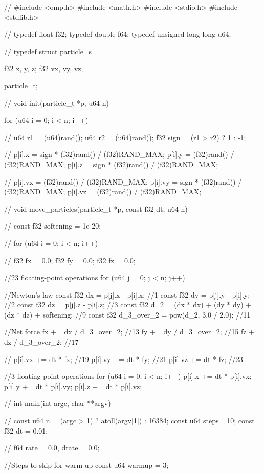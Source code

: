 \documentclass[a4paper, 12pt, twoside]{article}
\begin{document}
\begin{customFrame}
//
#include <omp.h>
#include <math.h>
#include <stdio.h>
#include <stdlib.h>

//
typedef float              f32;
typedef double             f64;
typedef unsigned long long u64;

//
typedef struct particle_s {

  f32 x, y, z;
  f32 vx, vy, vz;
  
} particle_t;

//
void init(particle_t *p, u64 n)
{
  for (u64 i = 0; i < n; i++)
    {
      //
      u64 r1 = (u64)rand();
      u64 r2 = (u64)rand();
      f32 sign = (r1 > r2) ? 1 : -1;
      
      //
      p[i].x = sign * (f32)rand() / (f32)RAND_MAX;
      p[i].y = (f32)rand() / (f32)RAND_MAX;
      p[i].z = sign * (f32)rand() / (f32)RAND_MAX;

      //
      p[i].vx = (f32)rand() / (f32)RAND_MAX;
      p[i].vy = sign * (f32)rand() / (f32)RAND_MAX;
      p[i].vz = (f32)rand() / (f32)RAND_MAX;
    }
}

//
void move_particles(particle_t *p, const f32 dt, u64 n)
{
  //
  const f32 softening = 1e-20;

  //
  for (u64 i = 0; i < n; i++)
    {
      //
      f32 fx = 0.0;
      f32 fy = 0.0;
      f32 fz = 0.0;

      //23 floating-point operations
      for (u64 j = 0; j < n; j++)
	{
	  //Newton's law
	  const f32 dx = p[j].x - p[i].x; //1
	  const f32 dy = p[j].y - p[i].y; //2
	  const f32 dz = p[j].z - p[i].z; //3
	  const f32 d_2 = (dx * dx) + (dy * dy) + (dz * dz) + softening; //9
	  const f32 d_3_over_2 = pow(d_2, 3.0 / 2.0); //11

	  //Net force
	  fx += dx / d_3_over_2; //13
	  fy += dy / d_3_over_2; //15
	  fz += dz / d_3_over_2; //17
	}

      //
      p[i].vx += dt * fx; //19
      p[i].vy += dt * fy; //21
      p[i].vz += dt * fz; //23
    }

  //3 floating-point operations
  for (u64 i = 0; i < n; i++)
    {
      p[i].x += dt * p[i].vx;
      p[i].y += dt * p[i].vy;
      p[i].z += dt * p[i].vz;
    }
}

//
int main(int argc, char **argv)
{
  //
  const u64 n = (argc > 1) ? atoll(argv[1]) : 16384;
  const u64 steps= 10;
  const f32 dt = 0.01;

  //
  f64 rate = 0.0, drate = 0.0;

  //Steps to skip for warm up
  const u64 warmup = 3;
  
}
\end{customFrame}
\end{document}
